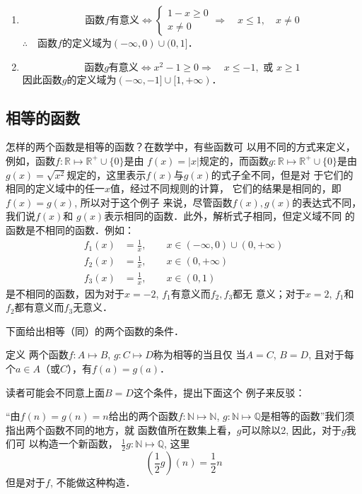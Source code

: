 \begin{solution}
    \begin{enumerate}
        \item \[\text{函数$f$有意义}\Leftrightarrow \begin{cases}
    1-x \ge 0\\
    x\ne 0
\end{cases}\Rightarrow\quad x\le 1, \quad x\ne 0\]
$\therefore\quad $函数$f$的定义域为$(-\infty,0)\cup(0,1]$．

\item \[\text{函数$g$有意义}\Leftrightarrow x^2-1\ge 0 \Rightarrow\quad x\le -1, \text{ 或 } x\ge 1\]
因此函数$g$的定义域为$(-\infty,-1]\cup[1,+\infty)$．
    \end{enumerate}
\end{solution}

\subsection{相等的函数}
怎样的两个函数是相等的函数？在数学中，有些函数可
以用不同的方式来定义，例如，函数$f:\mathbb{R}\mapsto \mathbb{R}^+\cup\{0\}$是由
$f(x)=|x|$规定的，而函数$g:\mathbb{R}\mapsto \mathbb{R}^+\cup\{0\}$是由$g(x)=\sqrt{x^2}$规定的，这里表示$f(x)$与$g(x)$的式子全不同，但是对
于它们的相同的定义域中的任一$x$值，经过不同规则的计算，
它们的结果是相同的，即$f(x)=g(x)$, 所以对于这个例子
来说，尽管函数$f(x),g(x)$的表达式不同，我们说$f(x)$和
$g(x)$表示相同的函数．此外，解析式子相同，但定义域不同
的函数是不相同的函数．例如：
\[\begin{split}
    f_1(x)&=\frac{1}{x},\qquad x\in (-\infty,0)\cup(0,+\infty)\\
    f_2(x)&=\frac{1}{x},\qquad x\in (0,+\infty)\\
    f_3(x)&=\frac{1}{x},\qquad x\in (0,1)
\end{split}\]
是不相同的函数，因为对于$x=-2$, $f_1$有意义而$f_2,f_3$都无
意义；对于$x=2$, $f_1$和$f_2$都有意义而$f_3$无意义．

下面给出相等（同）的两个函数的条件．

\begin{blk}{定义}
    两个函数$f:A\mapsto B$, $g:C\mapsto D$称为相等的当且仅
    当$A=C$, $B=D$, 且对于每个$a\in  A$（或$C$），有$f(a)=g(a)$．
\end{blk}

读者可能会不同意上面$B=D$这个条件，提出下面这个
例子来反驳：

“由$f(n)=g(n)=n$给出的两个函数$f:\mathbb{N}\mapsto\mathbb{N}$, $g: \mathbb{N}\mapsto \mathbb{Q}$是相等的函数”我们须指出两个函数不同的地方，就
函数值所在数集上看，$g$可以除以2, 因此，对于$g$我们可
以构造一个新函数，
$\frac{1}{2}g:\mathbb{N}\mapsto \mathbb{Q}$, 这里
\[\left(\frac{1}{2}g\right)(n)=\frac{1}{2}n\]
但是对于$f$, 不能做这种构造．

